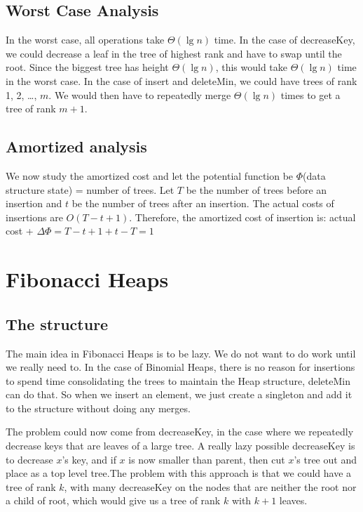 \documentclass[11pt]{article}
\begin{document}
\subsection{Worst Case Analysis}
In the worst case, all operations take $\Theta(\lg n)$ time. In the case of decreaseKey, we could decrease  a leaf in the tree of highest rank and have to swap until the root. Since the biggest tree has height $\Theta(\lg n)$, this would take $\Theta(\lg n)$ time in the worst case. In the case of insert and deleteMin, we could have trees of rank 1, 2, \dots, $m$. We would then have to repeatedly merge $\Theta(\lg n)$ times to get a tree of rank $m+1$. 

\subsection{Amortized analysis}
We now study the amortized cost and let the potential function be $\Phi$(data structure state) = number of trees. Let $T$ be the number of trees before an insertion and $t$ be the number of trees after an insertion. The actual costs of insertions are $O(T - t + 1)$. Therefore, the
amortized cost of insertion is: actual cost + $\Delta \Phi = T - t + 1 + t - T = 1$

\section{Fibonacci Heaps}

\subsection{The structure}
The main idea in Fibonacci Heaps is to be lazy. We do not want to do work until we really need to. In the case of Binomial Heaps, there is no reason for insertions to spend time consolidating the trees to maintain the Heap structure, deleteMin can do that. So when we insert an element, we just create a singleton and add it to the structure without doing any merges.
 
The problem could now come from decreaseKey, in the case where we repeatedly decrease keys that are leaves of a large tree. A really lazy possible decreaseKey is to decrease $x$'s key, and if $x$ is now smaller than parent, then cut $x$'s tree out and place as a top level tree.The problem with this approach is that we could have a tree of rank $k$, with many decreaseKey on the nodes that are neither the root nor a child of root, which would give us a tree of rank $k$ with $k+ 1$ leaves.
\end{document}

